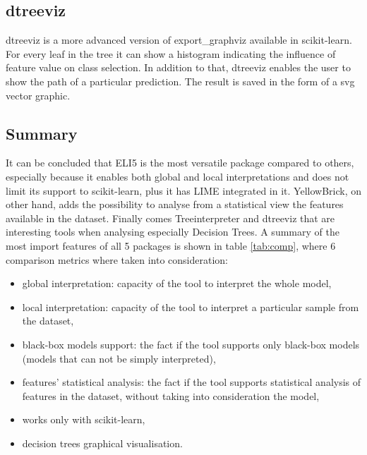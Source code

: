 \subsection{dtreeviz}
dtreeviz is a more advanced version of export\_graphviz available in scikit-learn. For every leaf in the tree it can show a histogram indicating the influence of feature value on class selection. In addition to that, dtreeviz enables the user to show the path of a particular prediction. The result is saved in the form of a svg vector graphic. 




\subsection{Summary}
It can be concluded that ELI5 is the most versatile package compared to others, especially because it enables both global and local interpretations and does not limit its support to scikit-learn, plus it has LIME integrated in it. YellowBrick, on other hand, adds the possibility to analyse from a statistical view the features available in the dataset. Finally comes Treeinterpreter and dtreeviz that are interesting tools when analysing especially Decision Trees. A summary of the most import features of all 5 packages is shown in table \ref{tab:comp}, where 6 comparison metrics where taken into consideration:
\begin{itemize}
    \item global interpretation: capacity of the tool to interpret the whole model,
    \item local interpretation: capacity of the tool to interpret a particular sample from the dataset,
    \item black-box models support: the fact if the tool supports only black-box models (models that can not be simply interpreted),
    \item features' statistical analysis: the fact if the tool supports statistical analysis of features in the dataset, without taking into consideration the model,
    \item works only with scikit-learn,
    \item decision trees graphical visualisation.
\end{itemize}

